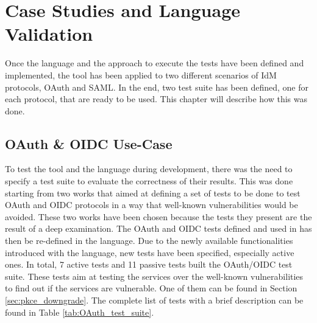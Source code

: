 \chapter{Case Studies and Language Validation}
\label{chap:Use_cases}
Once the language and the approach to execute the tests have been defined and implemented, the tool has been applied to two different scenarios of IdM protocols, OAuth and SAML. In the end, two test suite has been defined, one for each protocol, that are ready to be used. This chapter will describe how this was done.

\section{OAuth \& OIDC Use-Case}    
To test the tool and the language during development, there was the need to specify a test suite to evaluate the correctness of their results. This was done starting from two works \cite{claudio_grisenti,wendy_barreto} that aimed at defining a set of tests to be done to test OAuth and OIDC protocols in a way that well-known vulnerabilities would be avoided. These two works have been chosen because the tests they present are the result of a deep examination. The \gls{OAuth} and \gls{OIDC} tests defined and used in \cite{claudio_grisenti,wendy_barreto} has then be re-defined in the language. Due to the newly available functionalities introduced with the language, new tests have been specified, especially active ones. In total, 7 active tests and 11 passive tests built the OAuth/OIDC test suite. These tests aim at testing the services over the well-known vulnerabilities to find out if the services are vulnerable. One of them can be found in Section \ref{sec:pkce_downgrade}. The complete list of tests with a brief description can be found in Table \ref{tab:OAuth_test_suite}.

